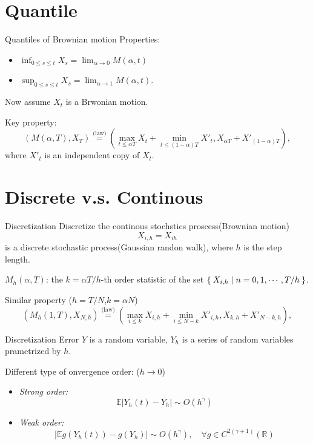 \documentclass[cjk]{beamer}
\begin{document}
\section{Quantile}
\begin{frame}{Quantiles of Brownian motion}
Properties:
\begin{itemize}
\item $\displaystyle\inf_{0\leq s \leq t}  X_s = \lim_{\alpha\to 0}M(\alpha,t)$
\item $\displaystyle\sup_{0\leq s \leq t} X_s = \lim_{\alpha\to 1} M(\alpha, t)$.
\end{itemize}
\vspace{1em}

Now assume $X_t$ is a Brwonian motion.

Key property:
\[
(M(\alpha,T),X_T) 
{\stackrel{\text{(law)}}{=}}
 (\max_{t\leq \alpha T}X_t+\min_{t\leq (1-\alpha)T}X'_t, X_{\alpha T}+X'_{(1-\alpha)T}),
\]
where $X'_t$ is an independent copy of $X_t$. 
\end{frame}

\section{Discrete v.s. Continous}
\begin{frame}{Discretization}
Discretize the continous stochstics proscess(Brownian motion)
\[
X_{i,h} = X_{ih}
\]
is a discrete stochastic process(Gaussian randon walk),
 where $h$ is the step length.


$M_h(\alpha,T)$: the $k=\alpha T/h$-th order statistic of the set 
$\Set{X_{i,h}|n=0,1,\cdots, T/h}$.

Similar property ($h=T/N$,$k=\alpha N$)
\[
(M_h(1,T),X_{N,h}) 
{\stackrel{\text{(law)}}{=}}
 (\max_{i\leq k}X_{i,h}+\min_{i\leq N-k}X'_{i,h}, X_{k,h}+X'_{N-k,h}),
\]
\end{frame}

\begin{frame}{Discretization Error}
$Y$ is a random variable, $Y_h$ is a series of random variables prametrized by $h$. 

Different type of onvergence order: ($h\to 0$)
\begin{itemize}
\item {\em Strong order:} 
  \[
  \mathbb{E}\left|Y_h(t) - Y_h\right| \sim O(h^\gamma)
  \]
\item {\em Weak order:}
  \[
  \left|\mathbb{E} g(Y_h(t)) - g(Y_h)\right|  \sim O(h^\gamma), 
  \quad \forall g\in C^{2(\gamma+1)}(\mathbb{R})
  \]
\end{itemize}

\end{frame}
\end{document}
